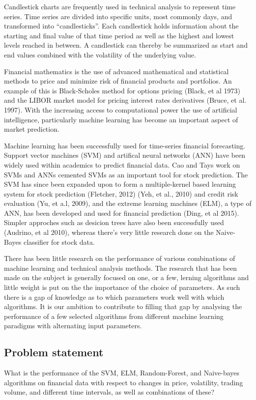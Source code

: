 \documentclass{article}
\begin{document}
Candlestick charts are frequently used in technical analysis to represent time series. Time series are divided into specific units, most commonly days, and transformed into “candlesticks”. Each candlestick holds information about the starting and final value of that time period as well as the highest and lowest levels reached in between. A candlestick can thereby be summarized as start and end values combined with the volatility of the underlying value.

Financial mathematics is the use of advanced mathematical and statistical methods to price and minimize risk of financial products and portfolios. An example of this is Black-Scholes method for options pricing (Black, et al 1973) and the LIBOR market model for pricing interest rates derivatives (Bruce, et al. 1997). With the increasing access to computational power the use of artificial intelligence, particularly machine learning has become an important aspect of market prediction. 

Machine learning has been successfully used for time-series financial forecasting. Support vector machines (SVM) and artifical neural networks (ANN) have been widely used  within academics to predict financial data. Cao and Tays work on SVMs and ANNs cemented SVMs as an important tool for stock prediction. The SVM has since been expanded upon to form a multiple-kernel based learning system for stock prediction (Fletcher, 2012) (Yeh, et al., 2010) and credit risk evaluation (Yu, et a.l, 2009), and the extreme learning machines (ELM), a type of ANN, has been developed and used for financial prediction (Ding, et al 2015). Simpler approches such as desicion trees have also been successfully used (Audrino, et al 2010), whereas there's very little research done on the Naive-Bayes classifier for stock data.

There has been little research on the performance of various combinations of machine learning and technical analysis methods. The research that has been made on the subject is generally focused on one, or a few, lerning algorithms and little weight is put on the the importance of the choice of parameters. As such there is a gap of knowledge as to which parameters work well with which algorithms. It is our ambition to contribute to filling that gap by analysing the performance of a few selected algorithms from different machine learning paradigms with alternating input parameters.

\subsection{Problem statement}
What is the performance of the SVM, ELM, Random-Forest, and Naive-bayes algorithms on financial data with respect to changes in price, volatility, trading volume, and different time intervals, as well as combinations of these?
\end{document}

